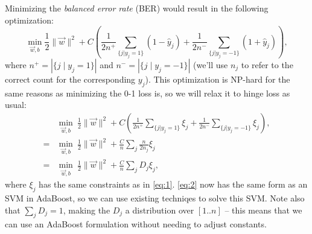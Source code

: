  Minimizing the \emph{balanced error rate} (BER) would result in the following optimization:
 \begin{equation}
   \min_{\vec{w},b}\frac{1}{2}\|\vec{w}\|^2 + 
   C\left( 
     \frac{1}{2n^+}\sum_{\{j|y_j=1\}}(1-\hat{y}_j) + 
     \frac{1}{2n^-}\sum_{\{j|y_j=-1\}}(1+\hat{y}_j) 
   \right),
 \end{equation}
 where $n^+ = |\{j\mid y_j=1\}|$ and $n^- = |\{j\mid y_j=-1\}|$ (we'll use $n_j$ to refer to the correct count for the corresponding $y_j$). 
 This optimization is NP-hard for the same reasons as minimizing the 0-1 loss is, so we will relax it to hinge loss as usual:
 \begin{align}
   &\min_{\vec{w},b}\ \frac{1}{2}\|\vec{w}\|^2 + 
   C\left( 
     \frac{1}{2n^+}\sum_{\{j|y_j=1\}}\xi_j + 
     \frac{1}{2n^-}\sum_{\{j|y_j=-1\}}\xi_j 
   \right),
 \\=&\min_{\vec{w},b}\ \frac{1}{2}\|\vec{w}\|^2 + 
   \frac{C}{n} \sum_j\frac{n}{2n_j}\xi_j
 \\=&\min_{\vec{w},b}\ \frac{1}{2}\|\vec{w}\|^2 + 
   \frac{C}{n} \sum_j D_j\xi_j,\label{eq:2}
 \end{align}
 where $\xi_j$ has the same constraints as in \eqref{eq:1}. 
 \eqref{eq:2} now has the same form as an SVM in AdaBoost, so we can use existing techniqes to solve this SVM. 
 Note also that $\sum_j D_j = 1$, making the $D_j$ a distribution over $[1..n]$ -- this means that we can use an AdaBoost formulation without needing to adjust constants.










